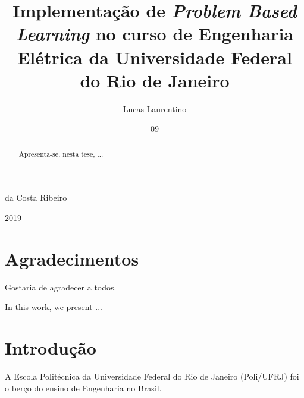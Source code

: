 \documentclass[grad,numbers]{coppe}
\begin{document}
    \title{Implementação de \textit{Problem Based Learning} no curso de Engenharia Elétrica da Universidade Federal do Rio de Janeiro}
    \author{Lucas Laurentino}{da Costa Ribeiro}
    
    
    
    \date{09}{2019}
    
    
    \maketitle
    
    \frontmatter

\dedication{A alguém cujo valor é digno desta dedicatória.}

\chapter*{Agradecimentos}

  Gostaria de agradecer a todos.

\begin{abstract}

  Apresenta-se, nesta tese, ...

\end{abstract}

\begin{foreignabstract}

In this work, we present ...

\end{foreignabstract}

\tableofcontents
\listoffigures
\listoftables
\printlosymbols
\printloabbreviations


\mainmatter

\chapter{Introdução}
	A Escola Politécnica  da Universidade Federal do Rio de Janeiro  (Poli/UFRJ) foi o berço do ensino de Engenharia no Brasil. 
\end{document}
